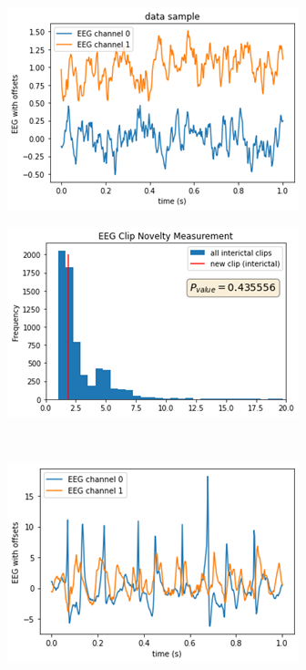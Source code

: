 \begin{figure}[htb]
    \centering
    \begin{subfigure}[b]{0.5\floatwidth}
        \includegraphics[width=\textwidth]{5Results/figs/samples/double_interictal_sample.png}
    \end{subfigure}
    \hfill    
    \begin{subfigure}[b]{0.5\floatwidth}
        \includegraphics[width=\textwidth]{5Results/figs/samples/double_interictal_pvalue.png}
    \end{subfigure}
    \\
    \begin{subfigure}[b]{0.5\floatwidth}
        \includegraphics[width=\textwidth]{5Results/figs/samples/double_ictal_sample.png}

\end{subfigure}
\end{figure}
